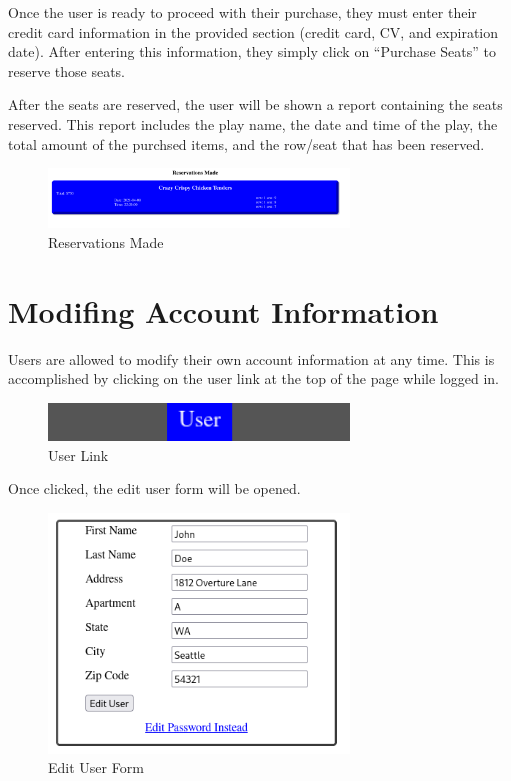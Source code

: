 Once the user is ready to proceed with their purchase, they must enter their credit card information in the provided section (credit card, CV, and expiration date). After entering this information, they simply click on ``Purchase Seats'' to reserve those seats.

After the seats are reserved, the user will be shown a report containing the seats reserved. This report includes the play name, the date and time of the play, the total amount of the purchsed items, and the row/seat that has been reserved.

\begin{figure}[ht]
    \centering
    \includegraphics[width=8cm]{images/chapter3/reservations made}
    \caption{Reservations Made}
    \label{fig:reservations_made}
\end{figure}

\clearpage

\section{Modifing Account Information}\label{sec:modifying_account_information}

Users are allowed to modify their own account information at any time. This is accomplished by clicking on the user link at the top of the page while logged in.

\begin{figure}[ht]
    \centering
    \includegraphics[width=8cm]{images/chapter3/user link}
    \caption{User Link}
    \label{fig:user_link}
\end{figure}

Once clicked, the edit user form will be opened.

\begin{figure}[ht]
    \centering
    \includegraphics[width=8cm]{images/chapter3/edit user form}
    \caption{Edit User Form}
    \label{fig:edit_user_form}
\end{figure}

